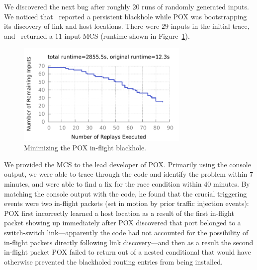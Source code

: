  We
discovered the next bug after roughly 20 runs of randomly generated inputs.
We noticed that \projectname~reported a persistent blackhole while POX was bootstrapping its
discovery of link and host locations. There were $29$ inputs in the initial trace, and \projectname~returned a $11$ input
MCS (runtime shown in Figure~\ref{fig:pox_discovery}).

\begin{figure}[t]
    \includegraphics[width=3.25in]{../graphs/runtime/pox_blackhole.pdf}
    \caption[]{\label{fig:pox_discovery} Minimizing the POX in-flight blackhole.}
\end{figure}

We provided the MCS to the lead developer of POX. Primarily using the
console output, we were able to trace through the code and identify the problem
within 7 minutes, and were able to find a fix for the race condition within 40
minutes. By matching the console output with the code, he found that the crucial
triggering events were two
in-flight packets (set in motion by prior traffic injection events):
POX first incorrectly learned a host location as a result of the first in-flight
packet showing up immediately after POX discovered that port belonged to
a switch-switch link---apparently the code had not accounted for the
possibility of in-flight packets directly following link discovery---and
then as a result the
second in-flight packet
POX failed to return out of a nested conditional that would have
otherwise prevented the blackholed routing entries from being installed.

